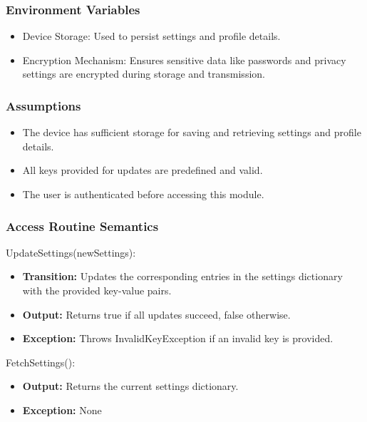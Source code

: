\documentclass[12pt, titlepage]{article}
\begin{document}
\subsubsection{Environment Variables}

\begin{itemize}
    \item Device Storage: Used to persist settings and profile details.
    \item Encryption Mechanism: Ensures sensitive data like passwords and privacy settings are encrypted during storage and transmission.
\end{itemize}

\subsubsection{Assumptions}

\begin{itemize}
    \item The device has sufficient storage for saving and retrieving settings and profile details.
    \item All keys provided for updates are predefined and valid.
    \item The user is authenticated before accessing this module.
\end{itemize}

\subsubsection{Access Routine Semantics}

\noindent UpdateSettings(newSettings):
\begin{itemize}
    \item \textbf{Transition:} Updates the corresponding entries in the settings dictionary with the provided key-value pairs.
    \item \textbf{Output:} Returns true if all updates succeed, false otherwise.
    \item \textbf{Exception:} Throws InvalidKeyException if an invalid key is provided.
\end{itemize}

\noindent FetchSettings():
\begin{itemize}
    \item \textbf{Output:} Returns the current settings dictionary.
    \item \textbf{Exception:} None
\end{itemize}
\end{document}
